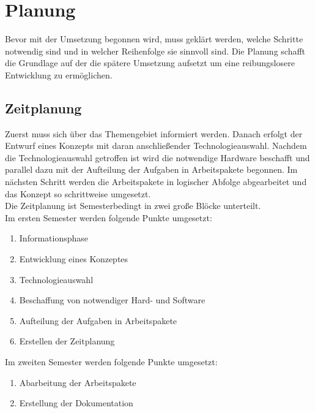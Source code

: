 \chapter{Planung}
Bevor mit der Umsetzung begonnen wird, muss geklärt werden, welche Schritte notwendig sind und in welcher Reihenfolge sie sinnvoll sind. Die Planung schafft die Grundlage auf der die spätere Umsetzung aufsetzt um eine reibungslosere Entwicklung zu ermöglichen.

\section{Zeitplanung}\label{Zeitplanung}
Zuerst muss sich über das Themengebiet informiert werden. Danach erfolgt der
Entwurf eines Konzepts mit daran anschließender Technologieauswahl. Nachdem die
Technologieauswahl getroffen ist wird die notwendige Hardware beschafft und
parallel dazu mit der Aufteilung der Aufgaben in Arbeitspakete begonnen. Im
nächsten Schritt werden die Arbeitspakete in logischer Abfolge abgearbeitet und
das Konzept so schrittweise umgesetzt.\\
Die Zeitplanung ist Semesterbedingt in zwei große Blöcke unterteilt.\\
Im ersten Semester werden folgende Punkte umgesetzt:

\begin{enumerate}
	\item Informationsphase
	\item Entwicklung eines Konzeptes
	\item Technologieauswahl
	\item Beschaffung von notwendiger Hard- und Software
	\item Aufteilung der Aufgaben in Arbeitspakete
	\item Erstellen der Zeitplanung
\end{enumerate}

Im zweiten Semester werden folgende Punkte umgesetzt:

\begin{enumerate}
	\item Abarbeitung der Arbeitspakete
	\item Erstellung der Dokumentation
\end{enumerate}
